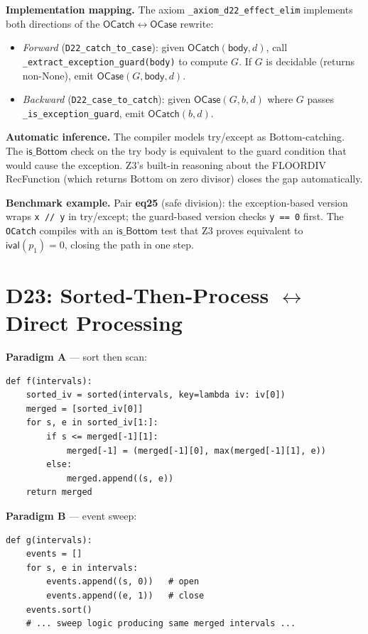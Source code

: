 \textbf{Implementation mapping.}
The axiom \texttt{\_axiom\_d22\_effect\_elim} implements both
directions of the $\mathsf{OCatch} \leftrightarrow \mathsf{OCase}$
rewrite:
\begin{itemize}
  \item \emph{Forward} (\texttt{D22\_catch\_to\_case}): given
    $\mathsf{OCatch}(\mathsf{body}, d)$, call
    \texttt{\_extract\_exception\_guard(body)} to compute
    $G$.  If $G$ is decidable (returns non-None), emit
    $\mathsf{OCase}(G, \mathsf{body}, d)$.
  \item \emph{Backward} (\texttt{D22\_case\_to\_catch}): given
    $\mathsf{OCase}(G, b, d)$ where $G$ passes
    \texttt{\_is\_exception\_guard}, emit
    $\mathsf{OCatch}(b, d)$.
\end{itemize}

\textbf{Automatic inference.}
The compiler models try/except as Bottom-catching.  The
$\mathsf{is\_Bottom}$ check on the try body is equivalent to the
guard condition that would cause the exception.  Z3's built-in
reasoning about the FLOORDIV RecFunction (which returns Bottom on
zero divisor) closes the gap automatically.

\textbf{Benchmark example.}
Pair \textbf{eq25} (safe division): the exception-based version
wraps \texttt{x // y} in try/except; the guard-based version checks
\texttt{y == 0} first.  The \texttt{OCatch} compiles with an
$\mathsf{is\_Bottom}$ test that Z3 proves equivalent to
$\mathsf{ival}(p_1) = 0$, closing the path in one step.

\section{D23: Sorted-Then-Process $\leftrightarrow$ Direct Processing}

\textbf{Paradigm A} --- sort then scan:
\begin{lstlisting}
def f(intervals):
    sorted_iv = sorted(intervals, key=lambda iv: iv[0])
    merged = [sorted_iv[0]]
    for s, e in sorted_iv[1:]:
        if s <= merged[-1][1]:
            merged[-1] = (merged[-1][0], max(merged[-1][1], e))
        else:
            merged.append((s, e))
    return merged
\end{lstlisting}

\textbf{Paradigm B} --- event sweep:
\begin{lstlisting}
def g(intervals):
    events = []
    for s, e in intervals:
        events.append((s, 0))   # open
        events.append((e, 1))   # close
    events.sort()
    # ... sweep logic producing same merged intervals ...
\end{lstlisting}

